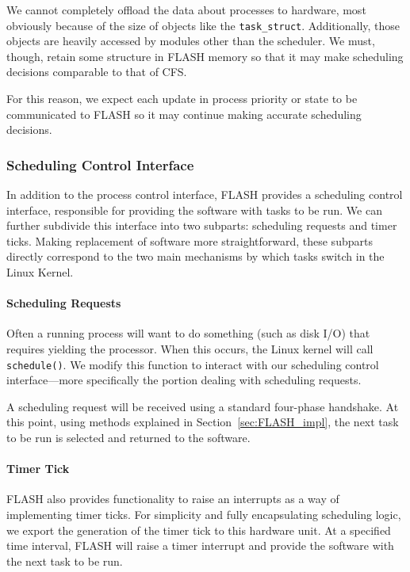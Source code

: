 \documentclass{sig-alternate-10pt}
\newcommand{\ttt}{\texttt}
\begin{document}
We cannot completely offload the data about processes to hardware, most
obviously because of the size of objects like the \ttt{task\_struct}.
Additionally, those objects are heavily accessed by modules other than the
scheduler.  We must, though, retain some structure in FLASH memory so that
it may make scheduling decisions comparable to that of CFS.

For this reason, we expect each update in process priority or state to be
communicated to FLASH so it may continue making accurate scheduling
decisions.

\subsubsection{Scheduling Control Interface}
In addition to the process control interface, FLASH provides a scheduling
control interface, responsible for providing the software with tasks to be
run.  We can further subdivide this interface into two subparts: scheduling
requests and timer ticks.  Making replacement of software more
straightforward, these subparts directly correspond to the two main mechanisms by which tasks switch in the Linux Kernel.

\paragraph{Scheduling Requests}
Often a running process will want to do something (such as disk I/O) that
requires yielding the processor.  When this occurs, the Linux kernel will
call \texttt{schedule()}.  We modify this function to interact with our
scheduling control interface---more specifically the portion dealing with
scheduling requests.

A scheduling request will be received using a standard four-phase handshake.
At this point, using methods explained in Section~\ref{sec:FLASH_impl}, the
next task to be run is selected and returned to the software.

\paragraph{Timer Tick}
FLASH also provides functionality to raise an interrupts as a way of implementing timer ticks.
For simplicity and fully encapsulating scheduling logic, we export the
generation of the timer tick to this hardware unit.  At a specified time
interval, FLASH will raise a timer interrupt and provide the software with
the next task to be run.
\end{document}
